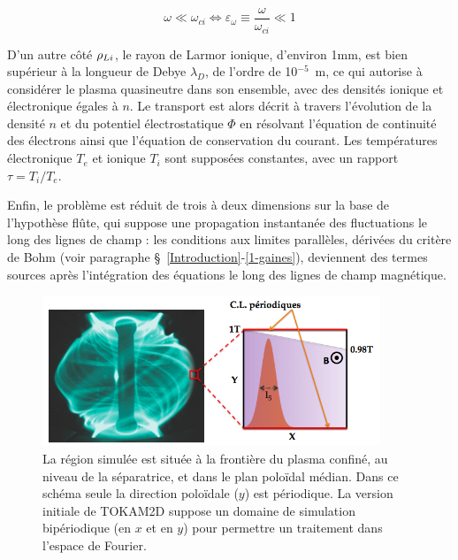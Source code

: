 \begin{refsection}
\begin{equation}
\omega\ll\omega_{ci}\Leftrightarrow
\varepsilon_\omega\equiv\frac{\omega}{\omega_{ci}}\ll 1
\end{equation}

D'un autre côté $\rho{_{Li}}$, le rayon de Larmor ionique, d'environ
1mm, est bien supérieur à la longueur de
Debye $\lambda_D$, de l'ordre de 10$^{-5}$~m, ce qui autorise à
considérer le plasma quasineutre dans son ensemble, avec des densités ionique
et électronique égales à $n$.
Le transport est alors décrit à travers l'évolution de la densité
$n$ et du potentiel électrostatique $\Phi$ en résolvant l'équation
de continuité des électrons ainsi que l'équation de conservation du courant. Les
températures électronique
$T_e$ et ionique $T_i$ sont supposées constantes, avec un rapport $\tau=T_i/T_e$.

Enfin, le problème est réduit de trois à deux dimensions sur la base de l'hypothèse
flûte, qui suppose une propagation instantanée des fluctuations le long des
lignes de champ : les conditions aux limites parallèles, dérivées du critère de
Bohm (voir paragraphe
\S~\ref{Introduction}-\ref{1-gaines}), deviennent des termes sources après
l'intégration des équations le long des lignes de champ magnétique.

\begin{figure}[!htbp]
\centering
    \includegraphics[width=0.9\textwidth]{figures/2-tokamSimDomain.png}
    \caption{La région simulée est située à la frontière du plasma confiné,
    au niveau de la séparatrice, et dans le plan poloïdal médian. Dans ce
    schéma seule la direction poloïdale ($y$) est périodique. La version
    initiale de TOKAM2D suppose un domaine de simulation
    bipériodique (en $x$ et en $y$) pour permettre un traitement dans l'espace de Fourier.}
    \label{2-figTokamGeom}
\end{figure}


\end{refsection}
